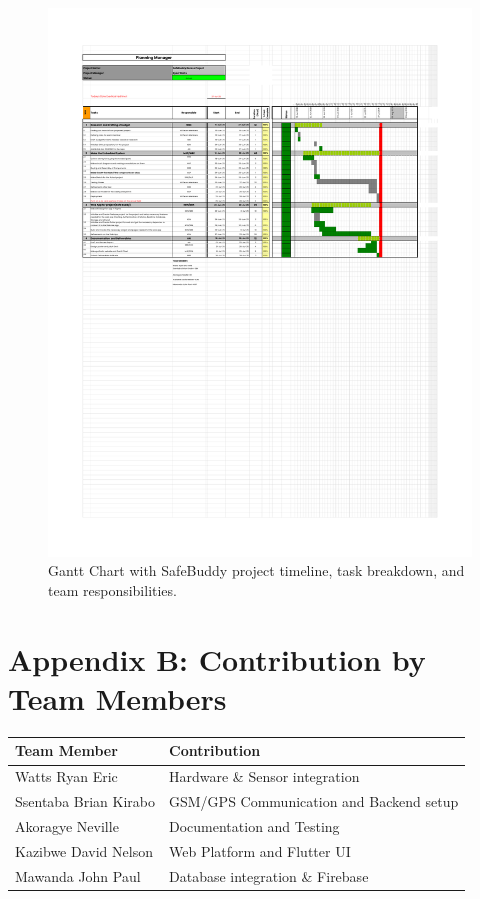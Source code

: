 \documentclass[12pt]{article}
\begin{document}
\begin{figure}[H]
  \centering
  \includegraphics[width=\textwidth]{Gantt_Chart.pdf}
  \caption{Gantt Chart with SafeBuddy project timeline, task breakdown, and team responsibilities.}
  \label{fig:gantt}
\end{figure}

\section*{Appendix B: Contribution by Team Members}
\begin{longtable}{@{}ll@{}}
\toprule
\textbf{Team Member} & \textbf{Contribution} \\
\midrule
Watts Ryan Eric & Hardware \& Sensor integration \\
Ssentaba Brian Kirabo & GSM/GPS Communication and Backend setup \\
Akoragye Neville & Documentation and Testing \\
Kazibwe David Nelson & Web Platform and Flutter UI \\
Mawanda John Paul & Database integration \& Firebase \\
\bottomrule
\end{longtable}
\end{document}
